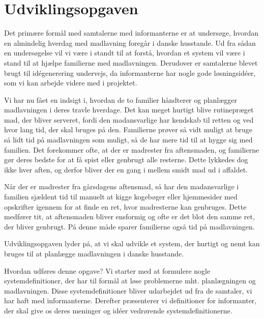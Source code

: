 \section{Udviklingsopgaven}
\label{sec:udviklingsopaven}

Det primære formål med samtalerne med informanterne er at undersøge, hvordan en almindelig hverdag med madlavning foregår i danske husstande. Ud fra sådan en undersøgelse vil vi være i standt til at forstå, hvordan et system vil være i stand til at hjælpe familierne med madlavningen. Derudover er samtalerne blevet brugt til idégenerering undervejs, da informanterne har nogle gode løsningsidéer, som vi kan arbejde videre med i projektet. 

Vi har nu fået en indsigt i, hvordan de to familier håndterer og planlægger madlavningen i deres travle hverdage. Det kan meget hurtigt blive rutinepræget mad, der bliver serveret, fordi den madansvarlige har kendskab til retten og ved hvor lang tid, der skal bruges på den. Familierne prøver så vidt muligt at bruge så lidt tid på madlavningen som muligt, så de har mere tid til at hygge sig med familien. Det forekommer ofte, at der er madrester fra aftensmaden, og familierne gør deres bedste for at få spist eller genbrugt alle resterne. Dette lykkedes dog ikke hver aften, og derfor bliver der en gang i mellem smidt mad ud i affaldet. 

Når der er madrester fra gårsdagens aftensmad, så har den madansvarlige i familien sjældent tid til manuelt at kigge kogebøger eller hjemmesider med opskrifter igennem for at finde en ret, hvor madresterne kan genbruges. Dette medfører tit, at aftensmaden bliver ensformig og ofte er det blot den samme ret, der bliver genbrugt. På denne måde sparer familierne også tid på madlavningen.

Udviklingsopgaven lyder på, at vi skal udvikle et system, der hurtigt og nemt kan bruges til at planlægge madlavningen i danske husstande. 

Hvordan udføres denne opgave? Vi starter med at formulere nogle systemdefinitioner, der har til formål at løse problemerne mht. planlægningen og madlavningen. Disse systemdefinitioner bliver udarbejdet ud fra de samtaler, vi har haft med informanterne. Derefter præsenterer vi definitioner for informanter, der skal give os deres meninger og idéer vedrørende systemdefinitionerne.